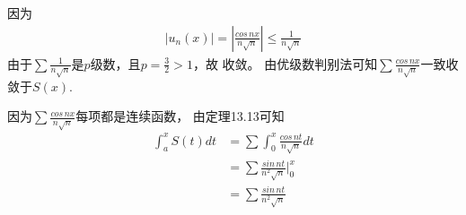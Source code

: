 \documentclass{article}
\begin{document}
因为
\begin{align*}
  |u_n(x)| = |\frac{cos\, nx}{n\sqrt{n}}| \leq \frac{1}{n\sqrt{n}}
\end{align*}
由于$\sum \frac{1}{n\sqrt{n}}$是$p$级数，且$p = \frac{3}{2} > 1$，故
收敛。
由优级数判别法可知$\sum \frac{cos\, nx}{n\sqrt{n}}$一致收敛于$S(x)$.

因为$\sum \frac{cos\, nx}{n\sqrt{n}}$每项都是连续函数，
由定理13.13可知
\begin{align*}
  \int_{a}^{x} S(t) dt
   & = \sum \int_{0}^{x} \frac{cos\, nt}{n\sqrt{n}} dt  \\
   & = \sum \frac{sin\, nt}{n^2\sqrt{n}} \bigg|_{0}^{x} \\
   & = \sum \frac{sin\, nt}{n^2\sqrt{n}}
\end{align*}
\end{document}
